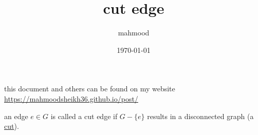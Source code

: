 \documentclass[a4paper,12pt]{article}
\author{mahmood}
\date{\today}
\title{cut edge}
\begin{document}
\maketitle
\begin{note}
this document and others can be found on my website\\
\url{https://mahmoodsheikh36.github.io/post/}
\end{note}
an edge \(e \in G\) is called a cut edge if \(G-\{e\}\) results in a disconnected graph (a \href{20230508181651-cut.org}{cut}).
\end{document}
